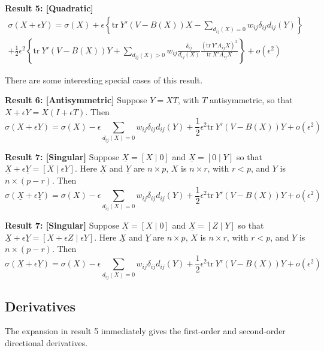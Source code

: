 \documentclass[12pt,]{article}
\begin{document}
\textbf{Result 5: {[}Quadratic{]}} \begin{multline}
\sigma(X+\epsilon Y)=\sigma(X)+\epsilon\left\{\text{tr}\ Y'(V-B(X))X-\sum_{d_{ij}(X)=0}w_{ij}\delta_{ij}d_{ij}(Y)\right\}\\ 
+\frac12\epsilon^2\left\{\text{tr}\ Y'(V-B(X))Y+\sum_{d_{ij}(X)>0}w_{ij}\frac{\delta_{ij}}{d_{ij}(X)}
\frac{(\text{tr}\ Y'A_{ij}X)^2}{\text{tr}\ X'A_{ij}X}\right\}+o(\epsilon^2)
\end{multline}

There are some interesting special cases of this result.

\textbf{Result 6: {[}Antisymmetric{]}} Suppose \(Y=XT\), with \(T\)
antisymmetric, so that \(X+\epsilon Y=X(I+\epsilon T)\). Then
\begin{equation}
\sigma(X+\epsilon Y)=\sigma(X)-\epsilon\sum_{d_{ij}(X)=0}w_{ij}\delta_{ij}d_{ij}(Y)
+\frac12\epsilon^2\text{tr}\ Y'(V-B(X))Y+o(\epsilon^2)
\end{equation}

\textbf{Result 7: {[}Singular{]}} Suppose \(\underline{X}=[X\mid 0]\)
and \(\underline{X}=[0\mid Y]\) so that
\(\underline{X}+\epsilon\underline{Y}=[X\mid\epsilon Y]\). Here
\(\underline{X}\) and \(\underline{Y}\) are \(n\times p\), \(X\) is
\(n\times r\), with \(r<p\), and \(Y\) is \(n\times(p-r)\). Then
\begin{equation}
\sigma(\underline{X}+\epsilon \underline{Y})=\sigma(X)-\epsilon\sum_{d_{ij}(X)=0}w_{ij}\delta_{ij}d_{ij}(Y)
+\frac12\epsilon^2\text{tr}\ Y'(V-B(X))Y+o(\epsilon^2)
\end{equation}

\textbf{Result 7: {[}Singular{]}} Suppose \(\underline{X}=[X\mid 0]\)
and \(\underline{X}=[Z\mid Y]\) so that
\(\underline{X}+\epsilon\underline{Y}=[X+\epsilon Z\mid\epsilon Y]\).
Here \(\underline{X}\) and \(\underline{Y}\) are \(n\times p\), \(X\) is
\(n\times r\), with \(r<p\), and \(Y\) is \(n\times(p-r)\). Then
\begin{equation}
\sigma(\underline{X}+\epsilon \underline{Y})=\sigma(X)-\epsilon\sum_{d_{ij}(X)=0}w_{ij}\delta_{ij}d_{ij}(Y)
+\frac12\epsilon^2\text{tr}\ Y'(V-B(X))Y+o(\epsilon^2)
\end{equation}

\hypertarget{derivatives}{%
\subsection{Derivatives}\label{derivatives}}

The expansion in result 5 immediately gives the first-order and
second-order directional derivatives.
\end{document}

